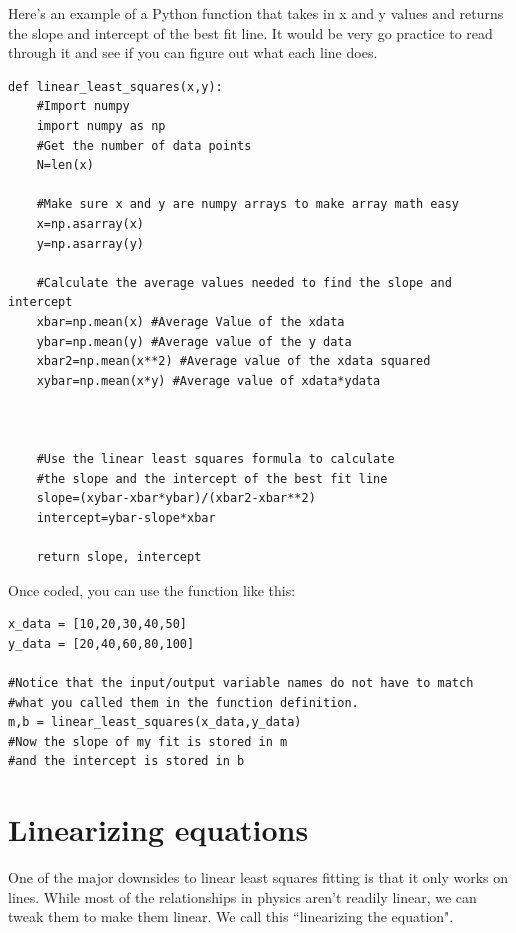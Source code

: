 \documentclass[twoside,11pt,ShortChapTitles]{BYUTextbook}
\begin{document}
Here's an example of a Python function that takes in x and y values and returns the slope and intercept of the best fit line.  It would be very go practice to read through it and see if you can figure out what each line does.
\begin{Verbatim}
def linear_least_squares(x,y):
    #Import numpy
    import numpy as np
    #Get the number of data points
    N=len(x)

    #Make sure x and y are numpy arrays to make array math easy
    x=np.asarray(x)
    y=np.asarray(y)

    #Calculate the average values needed to find the slope and intercept
    xbar=np.mean(x) #Average Value of the xdata
    ybar=np.mean(y) #Average value of the y data
    xbar2=np.mean(x**2) #Average value of the xdata squared
    xybar=np.mean(x*y) #Average value of xdata*ydata



    #Use the linear least squares formula to calculate
    #the slope and the intercept of the best fit line
    slope=(xybar-xbar*ybar)/(xbar2-xbar**2)
    intercept=ybar-slope*xbar

    return slope, intercept
\end{Verbatim}

Once coded, you can use the function like this:
\begin{Verbatim}
x_data = [10,20,30,40,50]
y_data = [20,40,60,80,100]

#Notice that the input/output variable names do not have to match
#what you called them in the function definition.
m,b = linear_least_squares(x_data,y_data)
#Now the slope of my fit is stored in m
#and the intercept is stored in b
\end{Verbatim}




\section{Linearizing equations}
One of the major downsides to linear least squares fitting is that it only works on lines.  While most of the relationships in physics aren't readily linear, we can tweak them to make them linear.  We call this ``linearizing the equation".
\end{document}
